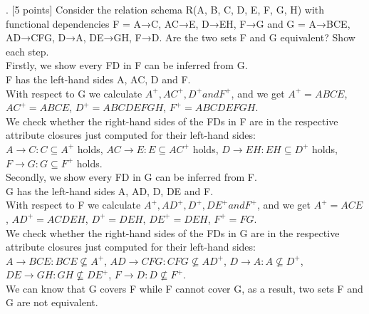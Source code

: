 \documentclass[]{article}
\begin{document}
	. [5 points] Consider the relation schema R(A, B, C, D, E, F, G, H) with functional dependencies F = {A→C, AC→E, D→EH, F→G} and G = {A→BCE, AD→CFG, D→A, DE→GH, F→D}. Are the two sets F and G equivalent? Show each step.  \\
	
	\noindent Firstly, we show every FD in F can be inferred from G.  \\
	
	\noindent F has the left-hand sides A, AC, D and F.  \\
	
	\noindent With respect to G we calculate $A^{+}, AC^{+}, D^{+} and F^{+}$, and we get $A^{+} = ABCE$, $AC^{+} = ABCE$, $D^{+} = ABCDEFGH$, $F^{+} = ABCDEFGH$.    \\
	
	\noindent We check whether the right-hand sides of the FDs in F are in the respective attribute closures just computed for their left-hand sides:  \\
	
	\noindent $A\rightarrow C: C\subseteq A^{+}$ holds, $AC\rightarrow E: E\subseteq AC^{+}$ holds, $D\rightarrow EH: EH\subseteq D^{+}$ holds, $F\rightarrow G: G\subseteq F^{+}$ holds.   \\
	
	\noindent Secondly, we show every FD in G can be inferred from F.  \\
	
	\noindent G has the left-hand sides A, AD, D, DE and F.  \\
	
	\noindent With respect to F we calculate $A^{+}, AD^{+}, D^{+}, DE^{+} and F^{+}$, and we get $A^{+} = ACE$, $AD^{+} = ACDEH$, $D^{+} = DEH$, $DE^{+} = DEH$, $F^{+} = FG$.    \\
	
	\noindent We check whether the right-hand sides of the FDs in G are in the respective attribute closures just computed for their left-hand sides:  \\
	
	\noindent $A\rightarrow BCE: BCE\not\subseteq A^{+}$, $AD\rightarrow CFG: CFG\not\subseteq AD^{+}$, $D\rightarrow A: A\not\subseteq D^{+}$, $DE\rightarrow GH: GH\not\subseteq DE^{+}$, $F\rightarrow D: D\not\subseteq F^{+}$.   \\
	
	\noindent We can know that G covers F while F cannot cover G, as a result, two sets F and G are not equivalent.  \\
	
\end{document}
